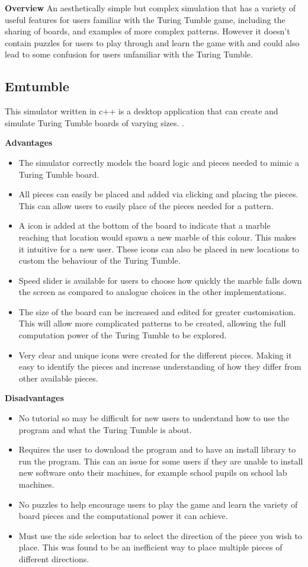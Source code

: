 \documentclass{l4proj}
\begin{document}
\textbf{Overview}
An aesthetically simple but complex simulation that has a variety of useful features for users familiar with the Turing Tumble game, including the sharing of boards, and examples of more complex patterns. However it doesn't contain puzzles for users to play through and learn the game with and could also lead to some confusion for users unfamiliar with the Turing Tumble.

\subsection{Emtumble}
This simulator written in c++ is a desktop application that can create and simulate Turing Tumble boards of varying sizes. \cite{tomita_oudonemtumble_2020}.

\textbf{Advantages}
\begin{itemize}
    \item The simulator correctly models the board logic and pieces needed to mimic a Turing Tumble board.
    \item All pieces can easily be placed and added via clicking and placing the pieces. This can allow users to easily place of the pieces needed for a pattern.
    \item A icon is added at the bottom of the board to indicate that a marble reaching that location would spawn a new marble of this colour. This makes it intuitive for a new user. These icons can also be placed in new locations to custom the behaviour of the Turing Tumble.
    \item Speed slider is available for users to choose how quickly the marble falls down the screen as compared to analogue choices in the other implementations.
    \item The size of the board can be increased and edited for greater customisation. This will allow more complicated patterns to be created, allowing the full computation power of the Turing Tumble to be explored.
    \item Very clear and unique icons were created for the different pieces. Making it easy to identify the pieces and increase understanding of how they differ from other available pieces.
\end{itemize}

\textbf{Disadvantages}
\begin{itemize}
    \item No tutorial so may be difficult for new users to understand how to use the program and what the Turing Tumble is about.
    \item Requires the user to download the program and to have an install library to run the program. This can an issue for some users if they are unable to install new software onto their machines, for example school pupils on school lab machines.
    \item No puzzles to help encourage users to play the game and learn the variety of board pieces and the computational power it can achieve.
    \item Must use the side selection bar to select the direction of the piece you wish to place. This was found to be an inefficient way to place multiple pieces of different directions.
\end{itemize}
\end{document}
